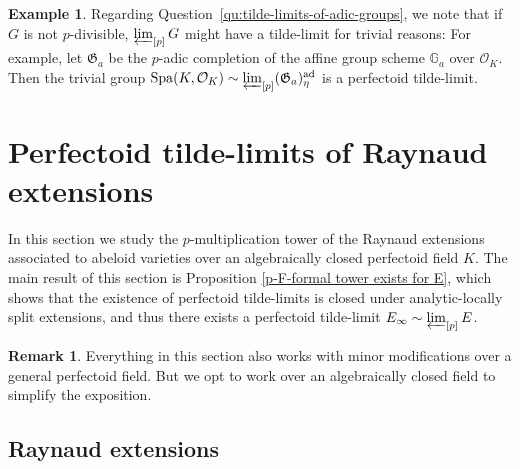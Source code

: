 \documentclass[10pt,oneside]{amsart}
\theoremstyle{definition}
\newtheorem{remark}[theorem]{Remark}
\newtheorem{example}[theorem]{Example}
\newcommand{\ad}{\mathrm{ad}}
\begin{document}
			
	\begin{example}
		Regarding Question~\ref{qu:tilde-limits-of-adic-groups}, we note
		that if $G$ is not $p$-divisible, $\varprojlim_{[p]}G$ might have a tilde-limit for trivial reasons: For example, let $\mathfrak G_a$  be the $p$-adic completion of the affine group scheme $\mathbb G_a$ over $\mathcal O_K$. Then the trivial group $\operatorname{Spa}(K,\mathcal O_K)\sim \varprojlim_{[p]}(\mathfrak G_a)^{\ad}_{\eta}$ is a perfectoid tilde-limit.
	\end{example}
	
 
	
 
	

	\section{Perfectoid tilde-limits of Raynaud extensions}\label{Raynaud extensions as principal bundles of formal and rigid spaces}
	In this section we study the $p$-multiplication tower of the Raynaud extensions associated to abeloid varieties over an algebraically closed perfectoid field $K$. The main result of this section is Proposition \ref{p-F-formal tower exists for E}, which shows that the existence of perfectoid tilde-limits is closed under analytic-locally split extensions, and thus there exists a perfectoid tilde-limit $E_\infty \sim \varprojlim_{[p]} E$.  
	
	
	\begin{remark}\label{Remark on dealing with general perfectoid fields by Galois descent}
		Everything in this section also works with minor modifications over a general perfectoid field. But we opt to work over an algebraically closed field to simplify the exposition.
	\end{remark}
	
	
	\subsection{Raynaud extensions}
	
\end{document}

